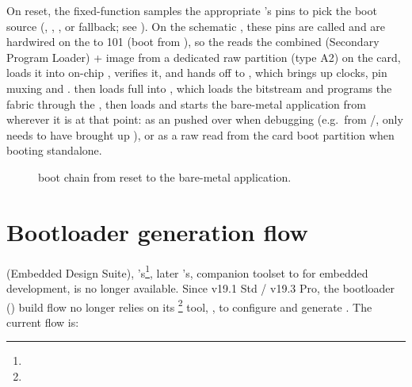 On reset, the fixed-function  samples the appropriate 's pins to pick the boot source (, , , or  fallback; see \cite[``Boot Select'']{CV-TRM}). On the  schematic \cite{DE1-SCH}, these pins are called  and are hardwired on the  to 101 (boot from ), so the  reads the combined  (Secondary Program Loader) +  image from a dedicated raw partition (type A2) on the  card, loads it into on-chip , verifies it, and hands off to , which brings up clocks, pin muxing and .  then loads full  into , which loads the  bitstream and programs the fabric through the , then loads and starts the bare-metal application from wherever it is at that point: as an  pushed over  when debugging (e.g.\ from /,  only needs to have brought up ), or as a raw  read from the  card boot partition when booting standalone.

\begin{figure}[htbp]
    \centering
    
    \caption{ boot chain from reset to the bare-metal application.}
    \label{fig:fpgasteel-boot-chain}
\end{figure}

\section{Bootloader generation flow}
\label{sec:fpgasteel-bootloader-generation}

 (Embedded Design Suite), 's\footnote{}, later 's, companion toolset to  for   embedded development, is no longer available. Since  v19.1 Std / v19.3 Pro, the bootloader () build flow no longer relies on its \footnote{} tool, , to configure and generate . The current flow is:

